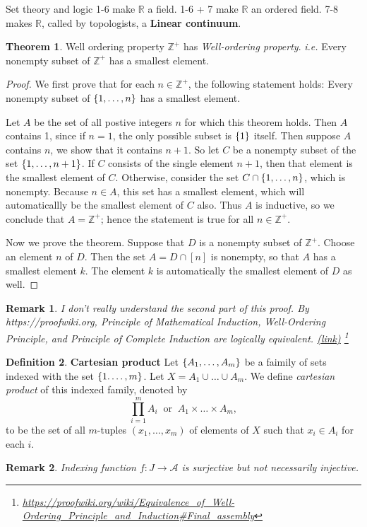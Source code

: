 \documentclass{report}
\newcommand*{\link}[1]{\href{#1}{(\underline{link})}%
  \footnote{\url{#1}}}
\newtheorem*{remark}{Remark}
\theoremstyle{definition}
\newtheorem{theorem}{Theorem}[chapter]
\newtheorem{definition}[theorem]{Definition}
\newcommand{\defn}[1]{\textbf{#1}\label{#1}\index{#1}}
\newcommand{\set}[1]{\ensuremath\{#1\}}
\newcommand{\ie}{\textit{i.e.}\xspace}
\newcommand{\ZZ}{\mathbb{Z}}
\newcommand{\RR}{\mathbb{R}}
\begin{document}
\begin{chapter}{Set theory and logic}
  1-6 make $\RR$ a field. 1-6 + 7 make $\RR$ an ordered field. 7-8
  makes $\RR$, called by topologists, a \defn{Linear continuum}.

  \begin{theorem}{Well ordering property}
    $\ZZ^+$ has \emph{Well-ordering property}. \ie Every nonempty
    subset of $\ZZ^+$ has a smallest element.
  \end{theorem}
  \begin{proof}
    We first prove that for each $n\in\ZZ^+$, the following statement
    holds: Every nonempty subset of $\set{1,\ldots,n}$ has a smallest
    element.

    Let $A$ be the set of all postive integers $n$ for which this
    theorem holds. Then $A$ contains 1, since if $n=1$, the only
    possible subset is $\set{1}$ itself. Then suppose $A$ contains $n$,
    we show that it contains $n+1$. So let $C$ be a nonempty subset of
    the set $\set{1,\ldots,n+1}$. If $C$ consists of the single
    element $n+1$, then that element is the smallest element of
    $C$. Otherwise, consider the set $C\cap\set{1,\ldots,n}$, which is
    nonempty. Because $n\in A$, this set has a smallest element, which
    will automaticallly be the smallest element of $C$ also. Thus $A$
    is inductive, so we conclude that $A=\ZZ^+$; hence the statement
    is true for all $n\in\ZZ^+$.

    Now we prove the theorem. Suppose that $D$ is a nonempty subset of
    $\ZZ^+$. Choose an element $n$ of $D$. Then the set $A=D\cap[n]$
    is nonempty, so that $A$ has a smallest element $k$. The element
    $k$ is automatically the smallest element of $D$ as well.
  \end{proof}
  \begin{remark}
    I don't really understand the second part of this proof. By
    {\textup{https://proofwiki.org}}, Principle of Mathematical
    Induction, Well-Ordering Principle, and Principle of Complete
    Induction are logically equivalent.
    \link{https://proofwiki.org/wiki/Equivalence_of_Well-Ordering_Principle_and_Induction\#Final_assembly}
  \end{remark}

  \begin{definition}{\defn{Cartesian product}}
    Let $\set{A_1,\ldots,A_m}$ be a faimily of sets indexed with the
    set $\set{1.\ldots,m}$. Let $X=A_1\cup\dots\cup A_m$. We define
    \emph{cartesian product} of this indexed family, denoted by
    $$\prod_{i=1}^mA_i\;\;\text{or}\;\;A_1\times \dots \times A_m,$$
    to be the set of all $m$-tuples $(x_1,\ldots,x_m)$ of elements of
    $X$ such that $x_i\in A_i$ for each $i$.
  \end{definition}
  \begin{remark}
    Indexing function $f:J\to\mathcal{A}$ is surjective but not
    necessarily injective.
  \end{remark}


\end{chapter}
\end{document}
